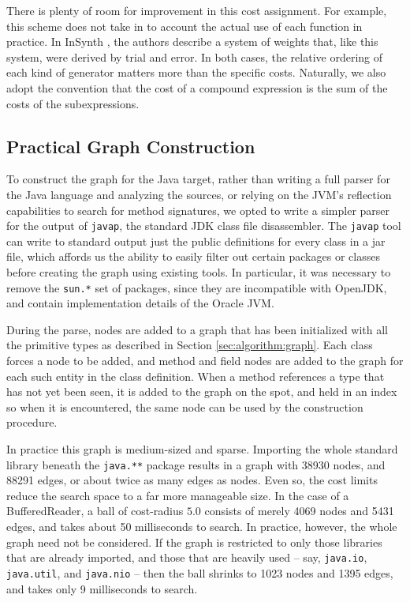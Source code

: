 There is plenty of room for improvement in this cost assignment. For example, this scheme does not take in to account the actual use of each function in practice. In InSynth \citep{GveroETAL13CompleteCompletionTypesWeights}, the authors describe a system of weights that, like this system, were derived by trial and error. In both cases, the relative ordering of each kind of generator matters more than the specific costs. Naturally, we also adopt the convention that the cost of a compound expression is the sum of the costs of the subexpressions.

\subsection{Practical Graph Construction}

To construct the graph for the Java target, rather than writing a full parser for the Java language and analyzing the sources, or relying on the JVM's reflection capabilities to search for method signatures, we opted to write a simpler parser for the output of \texttt{javap}, the standard JDK class file disassembler. The \texttt{javap} tool can write to standard output just the public definitions for every class in a jar file, which affords us the ability to easily filter out certain packages or classes before creating the graph using existing tools. In particular, it was necessary to remove the \texttt{sun.*} set of packages, since they are incompatible with OpenJDK, and contain implementation details of the Oracle JVM.

During the parse, nodes are added to a graph that has been initialized with all the primitive types as described in Section \ref{sec:algorithm:graph}. Each class forces a node to be added, and method and field nodes are added to the graph for each such entity in the class definition. When a method references a type that has not yet been seen, it is added to the graph on the spot, and held in an index so when it is encountered, the same node can be used by the construction procedure.

In practice this graph is medium-sized and sparse. Importing the whole standard library beneath the \texttt{java.**} package results in a graph with 38930 nodes, and 88291 edges, or about twice as many edges as nodes. Even so, the cost limits reduce the search space to a far more manageable size. In the case of a BufferedReader, a ball of cost-radius $5.0$ consists of merely 4069 nodes and 5431 edges, and takes about 50 milliseconds to search. In practice, however, the whole graph need not be considered. If the graph is restricted to only those libraries that are already imported, and those that are heavily used -- say, \texttt{java.io}, \texttt{java.util}, and \texttt{java.nio} -- then the ball shrinks to 1023 nodes and 1395 edges, and takes only 9 milliseconds to search.
